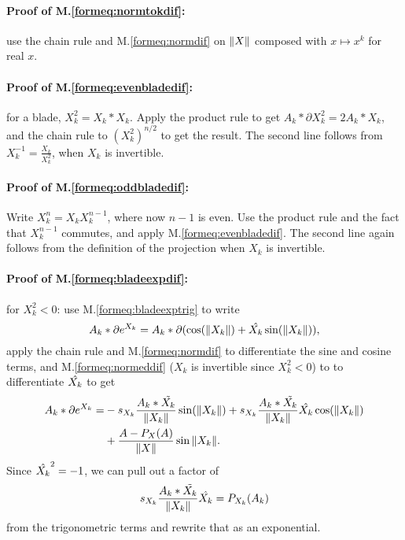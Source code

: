 \documentclass[a4paper,12pt]{article}
\newcommand{\meqref}[1]{M.\eqref{form#1}}
\theoremstyle{definition}
\begin{document}
\paragraph{Proof of \meqref{eq:normtokdif}:} use the chain rule and \meqref{eq:normdif} on $\left\lVert X\right\rVert$ composed with $x \mapsto x^k$ for real $x$.

\paragraph{Proof of \meqref{eq:evenbladedif}:} for a blade, $X_k^2 = X_k * X_k$.
Apply the product rule to get $A_k*\partial X_k^2 = 2 A_k * X_k$, and the chain rule to $(X_k^2)^{n/2}$ to get the result.
The second line follows from $X_k^{-1} = \frac{X_k}{X_k^2}$, when $X_k$ is invertible.

\paragraph{Proof of \meqref{eq:oddbladedif}:} Write $X_k^n = X_k X_k^{n-1}$, where now $n-1$ is even.
Use the product rule and the fact that $X_k^{n-1}$ commutes, and apply \meqref{eq:evenbladedif}.
The second line again follows from the definition of the projection when $X_k$ is invertible.

\paragraph{Proof of \meqref{eq:bladeexpdif}:} for $X_k^2 < 0$: use \meqref{eq:bladeexptrig} to write
\begin{equation}
A_k * \partial e^{X_k} = A_k * \partial(\cos(\left\lVert X_k\right\rVert) + \hat{X_k} \sin(\left\lVert X_k\right\rVert)),
\end{equation}
apply the chain rule and \meqref{eq:normdif} to differentiate the sine and cosine terms, and \meqref{eq:normeddif} ($X_k$ is invertible since $X_k^2 < 0$) to to differentiate $\hat{X_k}$ to get
\begin{equation}
\begin{split}
A_k * \partial e^{X_k} =& -s_{X_k}\frac{A_k*\tilde{X_k}}{\left\lVert X_k\right\rVert}\sin(\left\lVert X_k\right\rVert) + s_{X_k}\frac{A_k*\tilde{X_k}}{\left\lVert X_k\right\rVert} \hat{X_k} \cos(\left\lVert X_k\right\rVert)\\
 &+ \frac{A- P_{X}(A)}{\left\lVert X\right\rVert} \sin{\left\lVert X_k\right\rVert}.
\end{split}
\end{equation}
Since $\hat{X_k}^2 = -1$, we can pull out a factor of
\begin{equation*}
s_{X_k}\frac{A_k*\tilde{X_k}}{\left\lVert X_k\right\rVert}\hat{X_k} = P_{X_k}(A_k)
\end{equation*}
from the trigonometric terms and rewrite that as an exponential.
\end{document}
